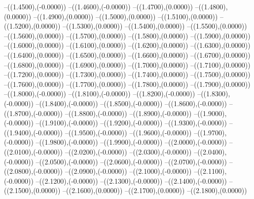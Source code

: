 {	--({\sx*(1.4500)},{\sy*(-0.0000)})
	--({\sx*(1.4600)},{\sy*(-0.0000)})
	--({\sx*(1.4700)},{\sy*(0.0000)})
	--({\sx*(1.4800)},{\sy*(0.0000)})
	--({\sx*(1.4900)},{\sy*(0.0000)})
	--({\sx*(1.5000)},{\sy*(0.0000)})
	--({\sx*(1.5100)},{\sy*(0.0000)})
	--({\sx*(1.5200)},{\sy*(0.0000)})
	--({\sx*(1.5300)},{\sy*(0.0000)})
	--({\sx*(1.5400)},{\sy*(0.0000)})
	--({\sx*(1.5500)},{\sy*(0.0000)})
	--({\sx*(1.5600)},{\sy*(0.0000)})
	--({\sx*(1.5700)},{\sy*(0.0000)})
	--({\sx*(1.5800)},{\sy*(0.0000)})
	--({\sx*(1.5900)},{\sy*(0.0000)})
	--({\sx*(1.6000)},{\sy*(0.0000)})
	--({\sx*(1.6100)},{\sy*(0.0000)})
	--({\sx*(1.6200)},{\sy*(0.0000)})
	--({\sx*(1.6300)},{\sy*(0.0000)})
	--({\sx*(1.6400)},{\sy*(0.0000)})
	--({\sx*(1.6500)},{\sy*(0.0000)})
	--({\sx*(1.6600)},{\sy*(0.0000)})
	--({\sx*(1.6700)},{\sy*(0.0000)})
	--({\sx*(1.6800)},{\sy*(0.0000)})
	--({\sx*(1.6900)},{\sy*(0.0000)})
	--({\sx*(1.7000)},{\sy*(0.0000)})
	--({\sx*(1.7100)},{\sy*(0.0000)})
	--({\sx*(1.7200)},{\sy*(0.0000)})
	--({\sx*(1.7300)},{\sy*(0.0000)})
	--({\sx*(1.7400)},{\sy*(0.0000)})
	--({\sx*(1.7500)},{\sy*(0.0000)})
	--({\sx*(1.7600)},{\sy*(0.0000)})
	--({\sx*(1.7700)},{\sy*(0.0000)})
	--({\sx*(1.7800)},{\sy*(0.0000)})
	--({\sx*(1.7900)},{\sy*(0.0000)})
	--({\sx*(1.8000)},{\sy*(-0.0000)})
	--({\sx*(1.8100)},{\sy*(-0.0000)})
	--({\sx*(1.8200)},{\sy*(-0.0000)})
	--({\sx*(1.8300)},{\sy*(-0.0000)})
	--({\sx*(1.8400)},{\sy*(-0.0000)})
	--({\sx*(1.8500)},{\sy*(-0.0000)})
	--({\sx*(1.8600)},{\sy*(-0.0000)})
	--({\sx*(1.8700)},{\sy*(-0.0000)})
	--({\sx*(1.8800)},{\sy*(-0.0000)})
	--({\sx*(1.8900)},{\sy*(-0.0000)})
	--({\sx*(1.9000)},{\sy*(-0.0000)})
	--({\sx*(1.9100)},{\sy*(-0.0000)})
	--({\sx*(1.9200)},{\sy*(-0.0000)})
	--({\sx*(1.9300)},{\sy*(-0.0000)})
	--({\sx*(1.9400)},{\sy*(-0.0000)})
	--({\sx*(1.9500)},{\sy*(-0.0000)})
	--({\sx*(1.9600)},{\sy*(-0.0000)})
	--({\sx*(1.9700)},{\sy*(-0.0000)})
	--({\sx*(1.9800)},{\sy*(-0.0000)})
	--({\sx*(1.9900)},{\sy*(-0.0000)})
	--({\sx*(2.0000)},{\sy*(-0.0000)})
	--({\sx*(2.0100)},{\sy*(-0.0000)})
	--({\sx*(2.0200)},{\sy*(-0.0000)})
	--({\sx*(2.0300)},{\sy*(-0.0000)})
	--({\sx*(2.0400)},{\sy*(-0.0000)})
	--({\sx*(2.0500)},{\sy*(-0.0000)})
	--({\sx*(2.0600)},{\sy*(-0.0000)})
	--({\sx*(2.0700)},{\sy*(-0.0000)})
	--({\sx*(2.0800)},{\sy*(-0.0000)})
	--({\sx*(2.0900)},{\sy*(-0.0000)})
	--({\sx*(2.1000)},{\sy*(-0.0000)})
	--({\sx*(2.1100)},{\sy*(-0.0000)})
	--({\sx*(2.1200)},{\sy*(-0.0000)})
	--({\sx*(2.1300)},{\sy*(-0.0000)})
	--({\sx*(2.1400)},{\sy*(-0.0000)})
	--({\sx*(2.1500)},{\sy*(0.0000)})
	--({\sx*(2.1600)},{\sy*(0.0000)})
	--({\sx*(2.1700)},{\sy*(0.0000)})
	--({\sx*(2.1800)},{\sy*(0.0000)})
}

